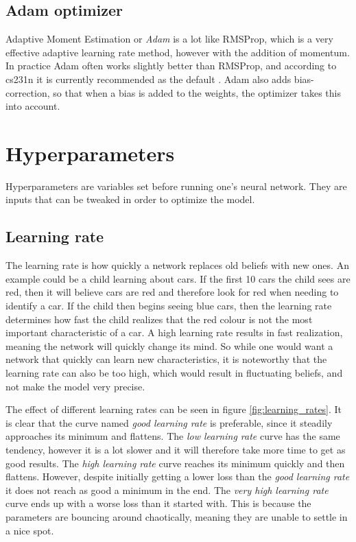 \subsection{Adam optimizer}
Adaptive Moment Estimation or \emph{Adam} is a lot like RMSProp, which is a very effective adaptive learning rate method, however with the addition of momentum. In practice Adam often works slightly better than RMSProp, and according to cs231n it is currently recommended as the default \citep{NN3}. Adam also adds bias-correction, so that when a bias is added to the weights, the optimizer takes this into account. 


\section{Hyperparameters}
Hyperparameters are variables set before running one's neural network. They are inputs that can be tweaked in order to optimize the model. 


\subsection{Learning rate}
The learning rate is how quickly a network replaces old beliefs with new ones. An example could be a child learning about cars. If the first 10 cars the child sees are red, then it will believe cars are red and therefore look for red when needing to identify a car. If the child then begins seeing blue cars, then the learning rate determines how fast the child realizes that the red colour is not the most important characteristic of a car. A high learning rate results in fast realization, meaning the network will quickly change its mind. So while one would want a network that quickly can learn new characteristics, it is noteworthy that the learning rate can also be too high, which would result in fluctuating beliefs, and not make the model very precise. 


The effect of different learning rates can be seen in figure \ref{fig:learning_rates}. It is clear that the curve named \emph{good learning rate} is preferable, since it steadily approaches its minimum and flattens. The \emph{low learning rate} curve has the same tendency, however it is a lot slower and it will therefore take more time to get as good results. The \emph{high learning rate} curve reaches its minimum quickly and then flattens. However, despite initially getting a lower loss than the \emph{good learning rate} it does not reach as good a minimum in the end. The \emph{very high learning rate} curve ends up with a worse loss than it started with. This is because the parameters are bouncing around chaotically, meaning they are unable to settle in a nice spot. 

